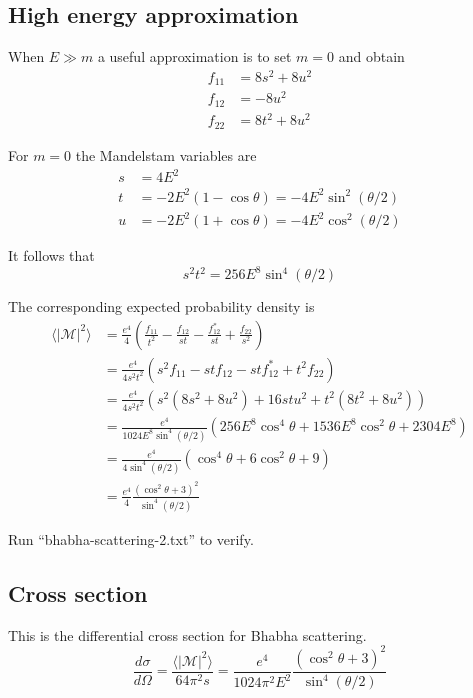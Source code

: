 \documentclass[12pt]{article}
\begin{document}
\subsection*{High energy approximation}
When $E\gg m$ a useful approximation is to set $m=0$ and obtain
\begin{align*}
f_{11}&= 8 s^2 + 8 u^2\\
f_{12}&= -8 u^2\\
f_{22}&= 8 t^2 + 8 u^2
\end{align*}

\noindent
For $m=0$ the Mandelstam variables are
\begin{align*}
s&=4E^2
\\
t&=-2E^2(1-\cos\theta)=-4E^2\sin^2(\theta/2)
\\
u&=-2E^2(1+\cos\theta)=-4E^2\cos^2(\theta/2)
\end{align*}

\noindent
It follows that
\begin{equation*}
s^2t^2=256E^8\sin^4(\theta/2)
\end{equation*}

\noindent
The corresponding expected probability density is
\begin{align*}
\langle|\mathcal{M}|^2\rangle
&=\frac{e^4}{4}
\left(
\frac{f_{11}}{t^2} - \frac{f_{12}}{st} -
\frac{f_{12}^*}{st} + \frac{f_{22}}{s^2}
\right)
\\
&=\frac{e^4}{4s^2t^2}
\left(
s^2f_{11}-stf_{12}-stf_{12}^*+t^2f_{22}
\right)
\\
&=\frac{e^4}{4s^2t^2}
\left(
s^2\left(8s^2+8u^2\right)+16stu^2+t^2\left(8t^2+8u^2\right)
\right)
\\
&=\frac{e^4}{1024E^8\sin^4(\theta/2)}
\left(
256E^8\cos^4\theta+1536E^8\cos^2\theta+2304E^8
\right)
\\
&=\frac{e^4}{4\sin^4(\theta/2)}
\left(\cos^4\theta+6\cos^2\theta+9\right)
\\
&=\frac{e^4}{4}
\frac{\left(\cos^2\theta+3\right)^2}{\sin^4(\theta/2)}
\end{align*}

\noindent
Run ``bhabha-scattering-2.txt'' to verify.

\subsection*{Cross section}
This is the differential cross section for Bhabha scattering.
\begin{equation*}
\frac{d\sigma}{d\Omega}
=\frac{\langle|\mathcal{M}|^2\rangle}{64\pi^2s}
=\frac{e^4}{1024\pi^2E^2}
\frac{\left(\cos^2\theta+3\right)^2}{\sin^4(\theta/2)}
\end{equation*}
\end{document}
